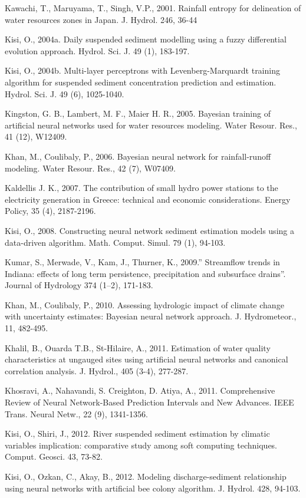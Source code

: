 \begin{hangingpar}{2em}
Kawachi, T., Maruyama, T., Singh, V.P., 2001. Rainfall entropy for delineation of water resources zones in Japan. J. Hydrol. 246, 36-44

Kisi, O., 2004a. Daily suspended sediment modelling using a fuzzy differential evolution approach. Hydrol. Sci. J. 49 (1), 183-197. 

Kisi, O., 2004b. Multi-layer perceptrons with Levenberg-Marquardt training algorithm for suspended sediment concentration prediction and estimation. Hydrol. Sci. J. 49 (6), 1025-1040.

Kingston, G. B., Lambert, M. F., Maier H. R., 2005. Bayesian training of artificial neural networks used for water resources modeling. Water Resour. Res., 41 (12), W12409.

Khan, M., Coulibaly, P., 2006. Bayesian neural network for rainfall-runoff modeling. Water Resour. Res., 42 (7), W07409.

Kaldellis J. K., 2007.  The contribution of small hydro power stations to the electricity generation in Greece: technical and economic considerations. Energy Policy, 35 (4), 2187-2196.

Kisi, O., 2008. Constructing neural network sediment estimation models using a data-driven algorithm. Math. Comput. Simul. 79 (1), 94-103.

Kumar, S., Merwade, V., Kam, J., Thurner, K., 2009.'' Streamflow trends in Indiana: effects of long term persistence, precipitation and subsurface drains''. Journal of Hydrology 374 (1–2), 171-183.

Khan, M., Coulibaly, P., 2010. Assessing hydrologic impact of climate change with uncertainty estimates: Bayesian neural network approach. J. Hydrometeor., 11, 482-495. 

Khalil, B., Ouarda T.B., St-Hilaire, A., 2011. Estimation of water quality characteristics at ungauged sites using artificial neural networks and canonical correlation analysis. J. Hydrol., 405 (3-4), 277-287.

Khosravi, A., Nahavandi, S. Creighton, D. Atiya, A., 2011. Comprehensive Review of Neural Network-Based Prediction Intervals and New Advances. IEEE Trans. Neural Netw., 22 (9), 1341-1356.

Kisi, O., Shiri, J., 2012. River suspended sediment estimation by climatic variables implication: comparative study among soft computing techniques. Comput. Geosci. 43, 73-82.

Kisi, O., Ozkan, C., Akay, B., 2012. Modeling discharge-sediment relationship using neural networks with artificial bee colony algorithm. J. Hydrol. 428, 94-103.


\end{hangingpar}
